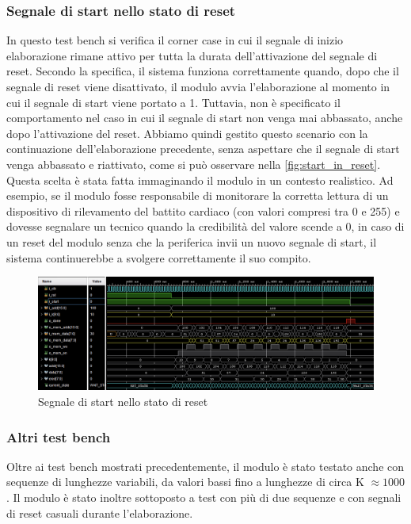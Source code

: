 \documentclass[11pt,a4paper]{article}
\newcommand{\m}[1]{{\fontfamily{zi4}\selectfont #1}}
\begin{document}
\subsubsection{Segnale di start nello stato di reset}
In questo test bench si verifica il corner case in cui il segnale di inizio elaborazione rimane attivo per tutta la durata dell'attivazione del segnale di reset. Secondo la specifica, il sistema funziona correttamente quando, dopo che il segnale di reset viene disattivato, il modulo avvia l'elaborazione al momento in cui il segnale di start viene portato a 1. Tuttavia, non è specificato il comportamento nel caso in cui il segnale di start non venga mai abbassato, anche dopo l'attivazione del reset. Abbiamo quindi gestito questo scenario con la continuazione dell'elaborazione precedente, senza aspettare che il segnale di start venga abbassato e riattivato, come si può osservare nella \autoref{fig:start_in_reset}. Questa scelta è stata fatta immaginando il modulo in un contesto realistico. Ad esempio, se il modulo fosse responsabile di monitorare la corretta lettura di un dispositivo di rilevamento del battito cardiaco (con valori compresi tra 0 e 255) e dovesse segnalare un tecnico quando la credibilità del valore scende a 0, in caso di un reset del modulo senza che la periferica invii un nuovo segnale di start, il sistema continuerebbe a svolgere correttamente il suo compito.

\vspace{0.5em}

\begin{figure}[htbp]
    \centering
    \includegraphics[width=\textwidth]{resources/start_in_reset.png}
    \caption{Segnale di start nello stato di reset}
    \label{fig:start_in_reset}
\end{figure}

\subsubsection{Altri test bench}
Oltre ai test bench mostrati precedentemente, il modulo è stato testato anche con sequenze di lunghezze variabili, da valori bassi fino a lunghezze di circa \m{K} $\approx 1000$. Il modulo è stato inoltre sottoposto a test con più di due sequenze e con segnali di reset casuali durante l'elaborazione.
\end{document}
